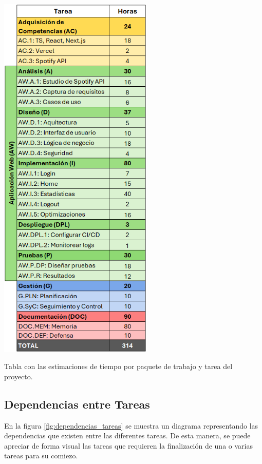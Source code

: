 \begin{table}[H]
    \centering
    \includegraphics[width=0.55\textwidth]{figures/estimaciones_tareas.png}
    \caption{Tabla con las estimaciones de tiempo por paquete de trabajo y tarea del proyecto.}
    \label{tab:estimaciones_tareas}
\end{table}

\subsection{Dependencias entre Tareas}

En la figura \ref{fig:dependencias_tareas} se muestra un diagrama representando las dependencias que existen entre las diferentes tareas. De esta manera, se puede apreciar de forma visual las tareas que requieren la finalización de una o varias tareas para su comiezo.

